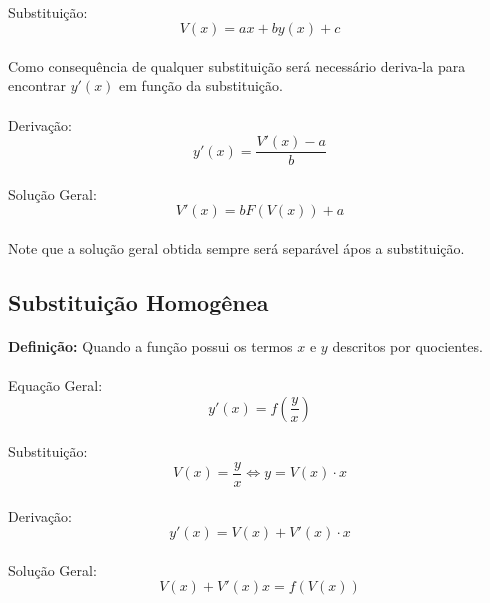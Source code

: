 \documentclass{article}
\begin{document}
        \paragraph{}Substituição:
            \[V(x)=ax+by(x)+c\]
        \paragraph{}Como consequência de qualquer substituição será necessário deriva-la para encontrar $y'(x)$ em função da substituição.
        \paragraph{}Derivação:
            \[y'(x)=\frac{V'(x)-a}{b}\]
        \paragraph{}Solução Geral:
            \[V'(x)=bF(V(x))+a\]
        \paragraph{}Note que a solução geral obtida sempre será separável ápos a substituição.
    
    \subsection{Substituição Homogênea}
        \paragraph{}\textbf{Definição:} Quando a função possui os termos $x$ e $y$ descritos por quocientes.
        \paragraph{}Equação Geral:
            \[y'(x)=f(\frac{y}{x})\]
        \paragraph{}Substituição:
            \[V(x)=\frac{y}{x} \Leftrightarrow y=V(x) \cdot x\]
        \paragraph{}Derivação:
            \[y'(x)=V(x)+V'(x) \cdot x\]
        \paragraph{}Solução Geral:
            \[V(x)+V'(x)x=f(V(x))\]
\end{document}
